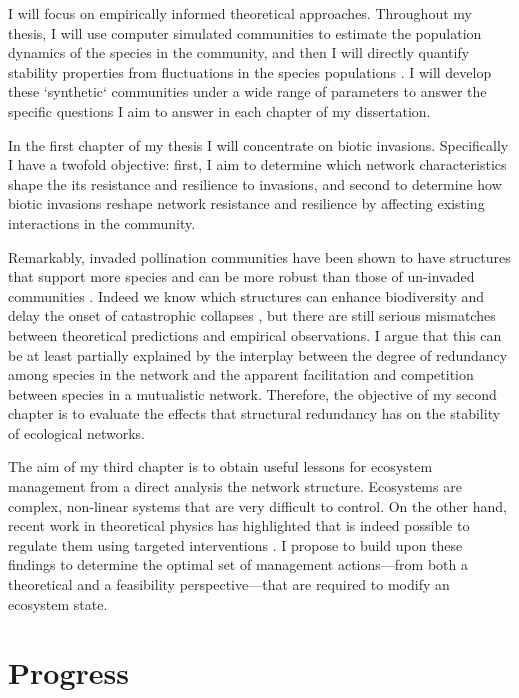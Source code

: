 \documentclass[a4paper]{article}
\begin{document}
I will focus on empirically informed theoretical approaches.
Throughout my thesis, I will use computer simulated communities to estimate the population dynamics of the species in the community, and then I will directly quantify stability properties from fluctuations in the species populations \autocite{Bastolla2009, Garcia-Algarra2013}.
I will develop these `synthetic` communities under a wide range of parameters to answer the specific questions I aim to answer in each chapter of my dissertation.

In the first chapter of my thesis I will concentrate on biotic invasions.
Specifically I have a twofold objective: first, I aim to determine which network characteristics shape the its resistance and resilience to invasions, and second to determine how biotic invasions reshape network resistance and resilience by affecting existing interactions in the community.

Remarkably, invaded pollination communities have been shown to have structures that support more species \autocite{Stouffer2014} and can be more robust than those of un-invaded communities \autocite{Albrecht2014}.
Indeed we know which structures can enhance biodiversity \autocite{Bastolla2009} and delay the onset of catastrophic collapses \autocite{Lever2014}, but there are still serious mismatches between theoretical predictions and empirical observations.
I argue that this can be at least partially explained by the interplay between the degree of redundancy among species in the network and the apparent facilitation and competition between species in a mutualistic network.
Therefore, the objective of my second chapter is to evaluate the effects that structural redundancy has on the stability of ecological networks.

The aim of my third chapter is to obtain useful lessons for ecosystem management from a direct analysis the network structure.
Ecosystems are complex, non-linear systems that are very difficult to control.
On the other hand, recent work in theoretical physics has highlighted that is indeed possible to regulate them using targeted interventions \autocite{Cornelius2013}.
I propose to build upon these findings to determine the optimal set of management actions---from both a theoretical and a feasibility perspective---that are required to modify an ecosystem state.






\section*{Progress}
\end{document}
